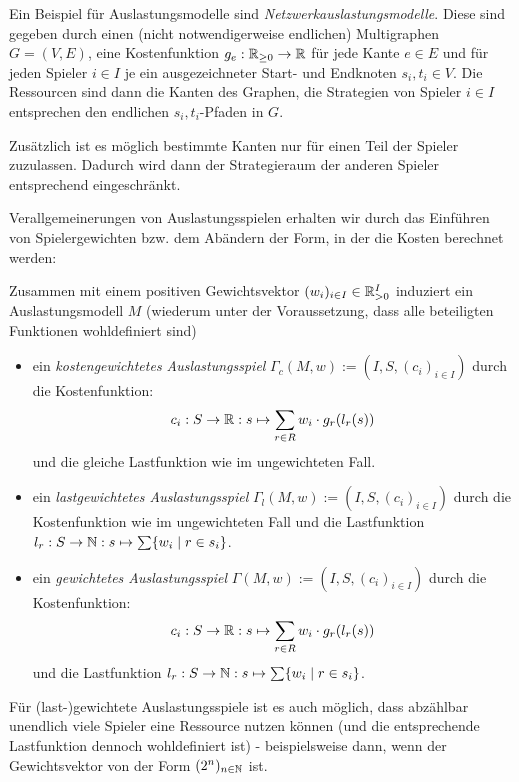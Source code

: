 \begin{bsp}
	Ein Beispiel für Auslastungsmodelle sind \emph{Netzwerkauslastungsmodelle}. Diese sind gegeben durch einen (nicht notwendigerweise endlichen) Multigraphen $G=(V,E)$, eine Kostenfunktion $g_e: \mathbb{R}_{\geq 0} \to \mathbb{R}$ für jede Kante $e \in E$ und für jeden Spieler $i \in I$ je ein ausgezeichneter Start- und Endknoten $s_i, t_i \in V$. Die Ressourcen sind dann die Kanten des Graphen, die Strategien von Spieler $i \in I$ entsprechen den endlichen $s_i,t_i$-Pfaden in $G$. 
	
	Zusätzlich ist es möglich bestimmte Kanten nur für einen Teil der Spieler zuzulassen. Dadurch wird dann der Strategieraum der anderen Spieler entsprechend eingeschränkt.
\end{bsp}

Verallgemeinerungen von Auslastungsspielen erhalten wir durch das Einführen von Spielergewichten bzw. dem Abändern der Form, in der die Kosten berechnet werden:

\begin{defn}\label{def:gewAuslastungsspiel}
	Zusammen mit einem positiven Gewichtsvektor $(w_i)_{i\in I} \in \mathbb{R}_{> 0}^I$ induziert ein Auslastungsmodell $M$ (wiederum unter der Voraussetzung, dass alle beteiligten Funktionen wohldefiniert sind)
	\begin{itemize}
		\item ein \emph{kostengewichtetes Auslastungsspiel} $\Gamma_c(M, w) := (I, S, (c_i)_{i \in I})$ durch die Kostenfunktion:
		\[c_i: S \to \mathbb{R}: s \mapsto \sum_{r \in R} w_i\cdot g_r(l_r(s)) \]
		und die gleiche Lastfunktion wie im ungewichteten Fall.
		\item ein \emph{lastgewichtetes Auslastungsspiel} $\Gamma_l(M, w) := (I, S, (c_i)_{i \in I})$ durch die Kostenfunktion wie im ungewichteten Fall und die Lastfunktion $l_r: S \to \mathbb{N}: s \mapsto \sum\{w_i \mid r \in s_i\}$.
		\item ein \emph{gewichtetes Auslastungsspiel} $\Gamma(M, w) := (I, S, (c_i)_{i \in I})$ durch die Kostenfunktion:
		\[c_i: S \to \mathbb{R}: s \mapsto \sum_{r \in R} w_i\cdot g_r(l_r(s)) \]
		und die Lastfunktion $l_r: S \to \mathbb{N}: s \mapsto \sum\{w_i \mid r \in s_i\}$.
	\end{itemize}	
\end{defn}

\begin{beob}
	Für (last-)gewichtete Auslastungsspiele ist es auch möglich, dass abzählbar unendlich viele Spieler eine Ressource nutzen können (und die entsprechende Lastfunktion dennoch wohldefiniert ist) - beispielsweise dann, wenn der Gewichtsvektor von der Form $(2^n)_{n \in \mathbb{N}}$ ist.
\end{beob}

